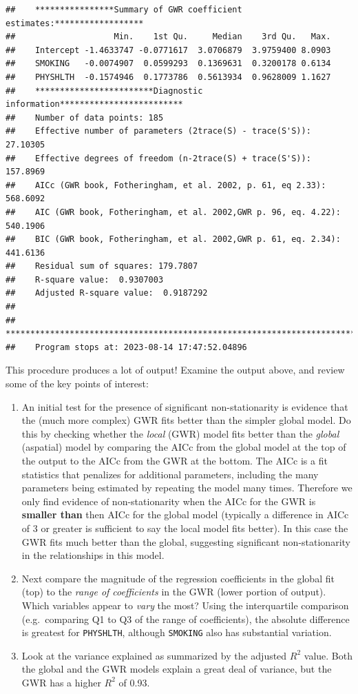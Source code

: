 \documentclass[
]{book}
\providecommand{\tightlist}{%
  \setlength{\itemsep}{0pt}\setlength{\parskip}{0pt}}
\begin{document}
\begin{verbatim}
##    ****************Summary of GWR coefficient estimates:******************
##                    Min.    1st Qu.     Median    3rd Qu.   Max.
##    Intercept -1.4633747 -0.0771617  3.0706879  3.9759400 8.0903
##    SMOKING   -0.0074907  0.0599293  0.1369631  0.3200178 0.6134
##    PHYSHLTH  -0.1574946  0.1773786  0.5613934  0.9628009 1.1627
##    ************************Diagnostic information*************************
##    Number of data points: 185 
##    Effective number of parameters (2trace(S) - trace(S'S)): 27.10305 
##    Effective degrees of freedom (n-2trace(S) + trace(S'S)): 157.8969 
##    AICc (GWR book, Fotheringham, et al. 2002, p. 61, eq 2.33): 568.6092 
##    AIC (GWR book, Fotheringham, et al. 2002,GWR p. 96, eq. 4.22): 540.1906 
##    BIC (GWR book, Fotheringham, et al. 2002,GWR p. 61, eq. 2.34): 441.6136 
##    Residual sum of squares: 179.7807 
##    R-square value:  0.9307003 
##    Adjusted R-square value:  0.9187292 
## 
##    ***********************************************************************
##    Program stops at: 2023-08-14 17:47:52.04896
\end{verbatim}

This procedure produces a lot of output! Examine the output above, and review some of the key points of interest:

\begin{enumerate}
\def\labelenumi{\arabic{enumi}.}
\tightlist
\item
  An initial test for the presence of significant non-stationarity is evidence that the (much more complex) GWR fits better than the simpler global model. Do this by checking whether the \emph{local} (GWR) model fits better than the \emph{global} (aspatial) model by comparing the AICc from the global model at the top of the output to the AICc from the GWR at the bottom. The AICc is a fit statistics that penalizes for additional parameters, including the many parameters being estimated by repeating the model many times. Therefore we only find evidence of non-stationarity when the AICc for the GWR is \textbf{smaller than} then AICc for the global model (typically a difference in AICc of 3 or greater is sufficient to say the local model fits better). In this case the GWR fits much better than the global, suggesting significant non-stationarity in the relationships in this model.
\item
  Next compare the magnitude of the regression coefficients in the global fit (top) to the \emph{range of coefficients} in the GWR (lower portion of output). Which variables appear to \emph{vary} the most? Using the interquartile comparison (e.g.~comparing Q1 to Q3 of the range of coefficients), the absolute difference is greatest for \texttt{PHYSHLTH}, although \texttt{SMOKING} also has substantial variation.
\item
  Look at the variance explained as summarized by the adjusted \(R^2\) value. Both the global and the GWR models explain a great deal of variance, but the GWR has a higher \(R^2\) of 0.93.
\end{enumerate}
\end{document}
